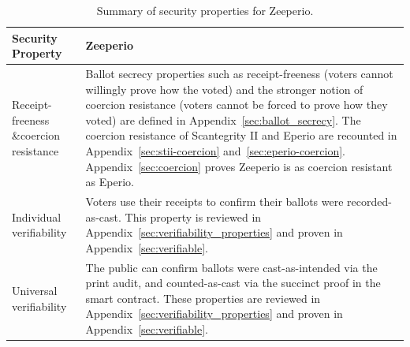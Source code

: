 
\begin{table}[t]
\centering
\small
\renewcommand{\arraystretch}{1.3}
\begin{tabular}{p{3cm}@{\hspace{0.2cm}}p{8.7cm}}
\toprule

Security Property & Zeeperio \\
\midrule
Receipt-freeness \&\newline coercion resistance &
Ballot secrecy properties such as receipt-freeness (voters cannot willingly prove how the voted) and the stronger notion of coercion resistance (voters cannot be forced to prove how they voted) are defined in Appendix~\ref{sec:ballot_secrecy}. The coercion resistance of Scantegrity II and Eperio are recounted in Appendix~\ref{sec:stii-coercion} and~\ref{sec:eperio-coercion}. Appendix~\ref{sec:coercion} proves Zeeperio is as coercion resistant as Eperio.\\

Individual \newline verifiability &

Voters use their receipts to confirm their ballots were recorded-as-cast. This property is reviewed in Appendix~\ref{sec:verifiability_properties} and proven in Appendix~\ref{sec:verifiable}.\\

Universal \newline verifiability &
The public can confirm ballots were cast-as-intended via the print audit, and counted-as-cast via the succinct proof in the smart contract. These properties are reviewed in Appendix~\ref{sec:verifiability_properties} and proven in Appendix~\ref{sec:verifiable}.\\
\bottomrule
\end{tabular}
\caption{Summary of security properties for Zeeperio.}
\label{tab:properties}
\end{table}